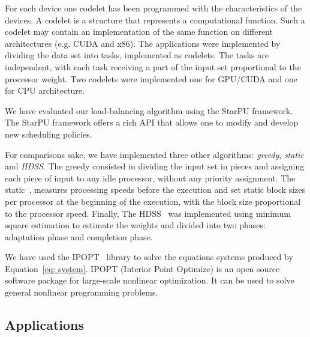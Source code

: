 \documentclass[journal]{IEEEtran}
\begin{document}
For each device one codelet has been programmed with the characteristics of the
devices. A codelet is a structure that represents a computational function. Such a
codelet may contain an implementation of the same function on different
architectures (e.g. CUDA and x86).  The applications were implemented by
dividing the data set into tasks, implemented as codelets. The tasks are
independent, with each task receiving a part of the input set proportional to
the processor weight. Two codelets were implemented one for GPU/CUDA and one for
CPU architecture.

We have evaluated our load-balancing algorithm using the StarPU framework.
The StarPU framework offers a rich API that allows one to modify and develop new scheduling policies.
%
%


For comparisons sake, we have implemented three other algorithms:
\emph{greedy}, \emph{static} and
\emph{HDSS}. The greedy consisted in dividing the input set in pieces and assigning
each piece of input to any idle processor, without any priority assignment. The
static~\cite{raphael}, measures processing speeds before the execution and set
static block sizes per processor at the beginning of the execution, with the
block size proportional to the processor speed. Finally, The HDSS~\cite{HDSS}
was implemented using minimum square estimation to estimate the weights and
divided into two phases: adaptation phase and completion phase.

We have used the IPOPT~\cite{point} library to solve the equations systems produced by Equation~\ref{eq: system}. IPOPT (Interior Point Optimize) is an open source software package for large-scale nonlinear optimization. It can be used to solve general nonlinear programming problems.

\subsection{Applications}
\end{document}

